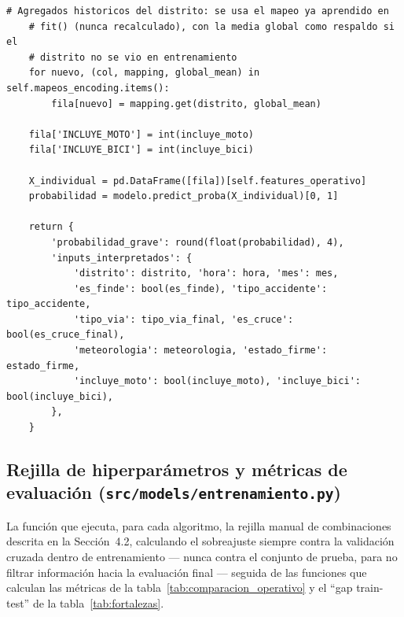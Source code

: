 \documentclass[11pt,a4paper]{article}
\begin{document}
\begin{lstlisting}[caption={Predicción de la probabilidad de gravedad de un accidente individual, a partir de los datos disponibles en el momento del aviso.}]
    # Agregados historicos del distrito: se usa el mapeo ya aprendido en
    # fit() (nunca recalculado), con la media global como respaldo si el
    # distrito no se vio en entrenamiento
    for nuevo, (col, mapping, global_mean) in self.mapeos_encoding.items():
        fila[nuevo] = mapping.get(distrito, global_mean)

    fila['INCLUYE_MOTO'] = int(incluye_moto)
    fila['INCLUYE_BICI'] = int(incluye_bici)

    X_individual = pd.DataFrame([fila])[self.features_operativo]
    probabilidad = modelo.predict_proba(X_individual)[0, 1]

    return {
        'probabilidad_grave': round(float(probabilidad), 4),
        'inputs_interpretados': {
            'distrito': distrito, 'hora': hora, 'mes': mes,
            'es_finde': bool(es_finde), 'tipo_accidente': tipo_accidente,
            'tipo_via': tipo_via_final, 'es_cruce': bool(es_cruce_final),
            'meteorologia': meteorologia, 'estado_firme': estado_firme,
            'incluye_moto': bool(incluye_moto), 'incluye_bici': bool(incluye_bici),
        },
    }
\end{lstlisting}

\subsection{Rejilla de hiperparámetros y métricas de evaluación (\texttt{src/models/entrenamiento.py})}
\label{app:hiperparametros}

La función que ejecuta, para cada algoritmo, la rejilla manual de combinaciones descrita en la Sección~4.2, calculando el sobreajuste siempre contra la validación cruzada dentro de entrenamiento --- nunca contra el conjunto de prueba, para no filtrar información hacia la evaluación final --- seguida de las funciones que calculan las métricas de la tabla~\ref{tab:comparacion_operativo} y el ``gap train-test'' de la tabla~\ref{tab:fortalezas}.
\end{document}
